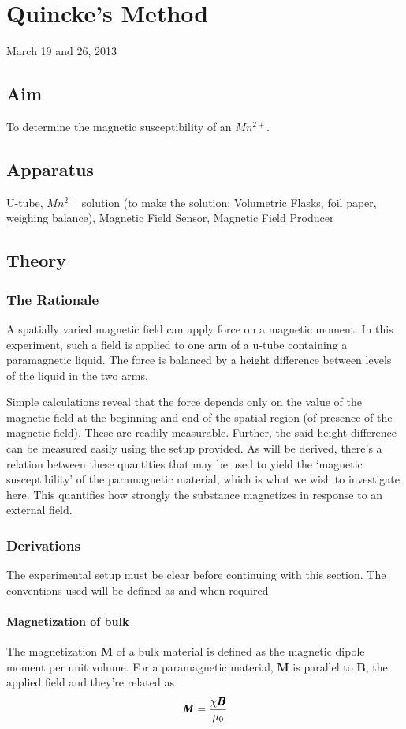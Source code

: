 \chapter{Quincke's Method}
\begin{flushright}
March 19 and 26, 2013
\end{flushright}
\section{Aim}
	To determine the magnetic susceptibility of an $Mn^{2+}$.
\section{Apparatus}
	U-tube, $Mn^{2+}$ solution (to make the solution: Volumetric Flasks, foil paper, weighing balance), Magnetic Field Sensor, Magnetic Field Producer

\section{Theory}
	\subsection{The Rationale}
		A spatially varied magnetic field can apply force on a magnetic moment. In this experiment, such a field is applied to one arm of a u-tube containing a paramagnetic liquid. The force is balanced by a height difference between levels of the liquid in the two arms.
		\par
		Simple calculations reveal that the force depends only on the value of the magnetic field at the beginning and end of the spatial region (of presence of the magnetic field). These are readily measurable. Further, the said height difference can be measured easily using the setup provided. As will be derived, there's a relation between these quantities that may be used to yield the `magnetic susceptibility' of the paramagnetic material, which is what we wish to investigate here. This quantifies how strongly the substance magnetizes in response to an external field.
	\subsection{Derivations}
		The experimental setup must be clear before continuing with this section. The conventions used will be defined as and when required.
		\subsubsection{Magnetization of bulk}
			The magnetization $\pmb M$ of a bulk material is defined as the magnetic dipole moment per unit volume. For a paramagnetic material, $\pmb M$ is parallel to $\pmb B$, the applied field and they're related as
			\begin{equation} {\label{eqn_magnetization}}
				\pmb M = \frac{\chi \pmb B} {\mu_0}
			\end{equation}
